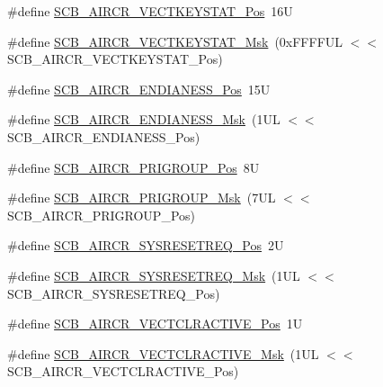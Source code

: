 \begin{DoxyCompactItemize}
\#define \mbox{\hyperlink{group___c_m_s_i_s___s_c_b_gaec404750ff5ca07f499a3c06b62051ef}{S\+C\+B\+\_\+\+A\+I\+R\+C\+R\+\_\+\+V\+E\+C\+T\+K\+E\+Y\+S\+T\+A\+T\+\_\+\+Pos}}~16U
\item 
\#define \mbox{\hyperlink{group___c_m_s_i_s___s_c_b_gabacedaefeefc73d666bbe59ece904493}{S\+C\+B\+\_\+\+A\+I\+R\+C\+R\+\_\+\+V\+E\+C\+T\+K\+E\+Y\+S\+T\+A\+T\+\_\+\+Msk}}~(0x\+F\+F\+F\+F\+U\+L $<$$<$ S\+C\+B\+\_\+\+A\+I\+R\+C\+R\+\_\+\+V\+E\+C\+T\+K\+E\+Y\+S\+T\+A\+T\+\_\+\+Pos)
\item 
\#define \mbox{\hyperlink{group___c_m_s_i_s___s_c_b_gad31dec98fbc0d33ace63cb1f1a927923}{S\+C\+B\+\_\+\+A\+I\+R\+C\+R\+\_\+\+E\+N\+D\+I\+A\+N\+E\+S\+S\+\_\+\+Pos}}~15U
\item 
\#define \mbox{\hyperlink{group___c_m_s_i_s___s_c_b_ga2f571f93d3d4a6eac9a3040756d3d951}{S\+C\+B\+\_\+\+A\+I\+R\+C\+R\+\_\+\+E\+N\+D\+I\+A\+N\+E\+S\+S\+\_\+\+Msk}}~(1\+U\+L $<$$<$ S\+C\+B\+\_\+\+A\+I\+R\+C\+R\+\_\+\+E\+N\+D\+I\+A\+N\+E\+S\+S\+\_\+\+Pos)
\item 
\#define \mbox{\hyperlink{group___c_m_s_i_s___s_c_b_gaca155deccdeca0f2c76b8100d24196c8}{S\+C\+B\+\_\+\+A\+I\+R\+C\+R\+\_\+\+P\+R\+I\+G\+R\+O\+U\+P\+\_\+\+Pos}}~8U
\item 
\#define \mbox{\hyperlink{group___c_m_s_i_s___s_c_b_ga8be60fff03f48d0d345868060dc6dae7}{S\+C\+B\+\_\+\+A\+I\+R\+C\+R\+\_\+\+P\+R\+I\+G\+R\+O\+U\+P\+\_\+\+Msk}}~(7\+U\+L $<$$<$ S\+C\+B\+\_\+\+A\+I\+R\+C\+R\+\_\+\+P\+R\+I\+G\+R\+O\+U\+P\+\_\+\+Pos)
\item 
\#define \mbox{\hyperlink{group___c_m_s_i_s___s_c_b_gaffb2737eca1eac0fc1c282a76a40953c}{S\+C\+B\+\_\+\+A\+I\+R\+C\+R\+\_\+\+S\+Y\+S\+R\+E\+S\+E\+T\+R\+E\+Q\+\_\+\+Pos}}~2U
\item 
\#define \mbox{\hyperlink{group___c_m_s_i_s___s_c_b_gaae1181119559a5bd36e62afa373fa720}{S\+C\+B\+\_\+\+A\+I\+R\+C\+R\+\_\+\+S\+Y\+S\+R\+E\+S\+E\+T\+R\+E\+Q\+\_\+\+Msk}}~(1\+U\+L $<$$<$ S\+C\+B\+\_\+\+A\+I\+R\+C\+R\+\_\+\+S\+Y\+S\+R\+E\+S\+E\+T\+R\+E\+Q\+\_\+\+Pos)
\item 
\#define \mbox{\hyperlink{group___c_m_s_i_s___s_c_b_gaa30a12e892bb696e61626d71359a9029}{S\+C\+B\+\_\+\+A\+I\+R\+C\+R\+\_\+\+V\+E\+C\+T\+C\+L\+R\+A\+C\+T\+I\+V\+E\+\_\+\+Pos}}~1U
\item 
\#define \mbox{\hyperlink{group___c_m_s_i_s___s_c_b_ga212c5ab1c1c82c807d30d2307aa8d218}{S\+C\+B\+\_\+\+A\+I\+R\+C\+R\+\_\+\+V\+E\+C\+T\+C\+L\+R\+A\+C\+T\+I\+V\+E\+\_\+\+Msk}}~(1\+U\+L $<$$<$ S\+C\+B\+\_\+\+A\+I\+R\+C\+R\+\_\+\+V\+E\+C\+T\+C\+L\+R\+A\+C\+T\+I\+V\+E\+\_\+\+Pos)
\item 
$$
\end{DoxyCompactItemize}
